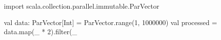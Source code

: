 import scala.collection.parallel.immutable.ParVector

val data: ParVector[Int] = ParVector.range(1, 1000000)
val processed = data.map(_ * 2).filter(_ %
